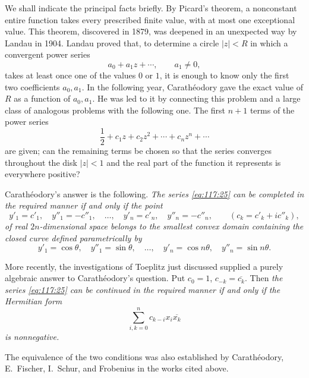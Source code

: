 \documentclass[
  paper=b5,
  fontsize=13pt,
  twoside=true,
  open=any,
  bookmarkpackage=false,
  chapterprefix=true,
  headings=normal
]{scrbook}
\theoremstyle{definition}
\begin{document}
We shall indicate the principal facts briefly.  By Picard's theorem, a
nonconstant entire function takes every prescribed finite value, with at most
one exceptional value.  This theorem, discovered in 1879, was deepened in an
unexpected way by Landau in 1904.  Landau proved that, to determine a circle
\(|z|<R\) in which a convergent power series
\[
  a_0+a_1z+\cdots,\qquad a_1\ne0,
\]
takes at least once one of the values \(0\) or \(1\), it is enough to know
only the first two coefficients \(a_0,a_1\).  In the following year,
Carathéodory gave the exact value of \(R\) as a function of \(a_0,a_1\).  He
was led to it by connecting this problem and a large class of analogous
problems with the following one.  The first \(n+1\) terms of the power series
\begin{equation}
  \frac12+c_1z+c_2z^2+\cdots+c_nz^n+\cdots
  \tag{25}\label{eq:117:25}
\end{equation}
are given;
can the remaining terms be chosen so that the series converges throughout the
disk \(|z|<1\) and the real part of the function it represents is everywhere
positive?

Carathéodory's answer is the following.  \emph{The series
\eqref{eq:117:25} can be completed in the required manner if and only if the
point}
\[
  y'_1=c'_1,\quad y''_1=-c''_1,\quad\ldots,\quad
  y'_n=c'_n,\quad y''_n=-c''_n,
  \qquad(c_k=c'_k+ic''_k),
\]
\emph{of real \(2n\)-dimensional space belongs to the smallest convex domain
containing the closed curve defined parametrically by}
\[
  y'_1=\cos\theta,\quad y''_1=\sin\theta,\quad\ldots,\quad
  y'_n=\cos n\theta,\quad y''_n=\sin n\theta.
\]

More recently, the investigations of Toeplitz just discussed supplied a purely
algebraic answer to Carathéodory's question.  Put
\(c_0=1\), \(c_{-k}=\overline{c_k}\).  Then \emph{the series
\eqref{eq:117:25} can be continued in the required manner if and only if the
Hermitian form}
\begin{equation}
  \sum_{i,k=0}^{n}c_{k-i}x_i\overline{x_k}
  \tag{26}\label{eq:117:26}
\end{equation}
\emph{is nonnegative.}

The equivalence of the two conditions was also established by Carathéodory,
E.~Fischer, I.~Schur, and Frobenius in the works cited above.
\end{document}
